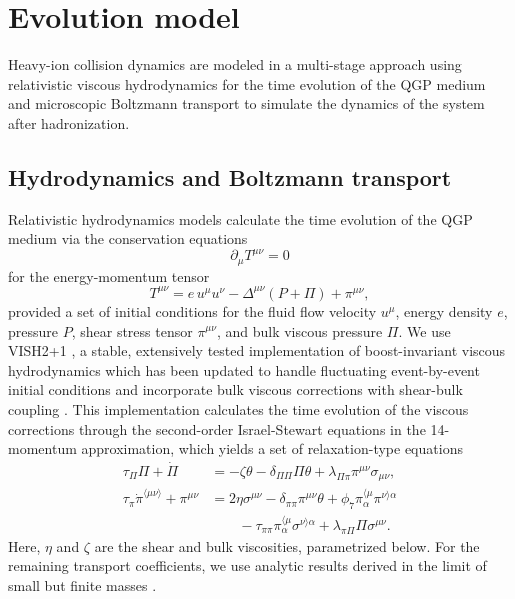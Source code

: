 \documentclass[aps,prc,reprint,amsmath,nofootinbib]{revtex4-1}
\begin{document}
\section{Evolution model}

Heavy-ion collision dynamics are modeled in a multi-stage approach using relativistic viscous hydrodynamics for the time evolution of the QGP medium and microscopic Boltzmann transport to simulate the dynamics of the system after hadronization.

\subsection{Hydrodynamics and Boltzmann transport}

Relativistic hydrodynamics models calculate the time evolution of the QGP medium via the conservation equations
\begin{equation}
  \partial_\mu T^{\mu\nu} = 0
  \label{eq:conservation}
\end{equation}
for the energy-momentum tensor
\begin{equation}
  T^{\mu\nu} = e \, u^\mu u^\nu  - \Delta^{\mu\nu} (P + \Pi) + \pi^{\mu\nu},
\end{equation}
provided a set of initial conditions for the fluid flow velocity $u^\mu$, energy density $e$, pressure $P$, shear stress tensor $\pi^{\mu\nu}$, and bulk viscous pressure $\Pi$.
We use VISH2+1 \cite{Song:2007ux}, a stable, extensively tested implementation of boost-invariant viscous hydrodynamics which has been updated to handle fluctuating event-by-event initial conditions \cite{Shen:2014vra} and incorporate bulk viscous corrections with shear-bulk coupling \cite{Liu:2015bik}.
This implementation calculates the time evolution of the viscous corrections through the second-order Israel-Stewart equations \cite{Israel:1979wp, Israel:1976aa} in the 14-momentum approximation, which yields a set of relaxation-type equations \cite{Denicol:2014vaa, Ryu:2015vwa}
\begin{subequations}
  \label{eq:relaxation}
  \begin{align}
    \tau_\Pi \Pi + \dot{\Pi} &=
      - \zeta \theta - \delta_{\Pi\Pi} \Pi\theta
      + \lambda_{\Pi\pi} \pi^{\mu\nu} \sigma_{\mu\nu}, \\[1ex]
    \tau_\pi \dot{\pi}^{\langle \mu\nu \rangle} + \pi^{\mu\nu} &=
      2\eta\sigma^{\mu\nu} - \delta_{\pi\pi} \pi^{\mu\nu} \theta
      + \phi_7 \pi_\alpha^{\langle \mu} \pi^{\nu \rangle \alpha} \nonumber \\
      &\qquad {} - \tau_{\pi\pi} \pi_\alpha^{\langle \mu}\sigma^{\nu \rangle \alpha}
      + \lambda_{\pi\Pi} \Pi \sigma^{\mu\nu}.
  \end{align}
\end{subequations}
Here, $\eta$ and $\zeta$ are the shear and bulk viscosities, parametrized below.
For the remaining transport coefficients, we use analytic results derived in the limit of small but finite masses \cite{Denicol:2014vaa}.
\end{document}
